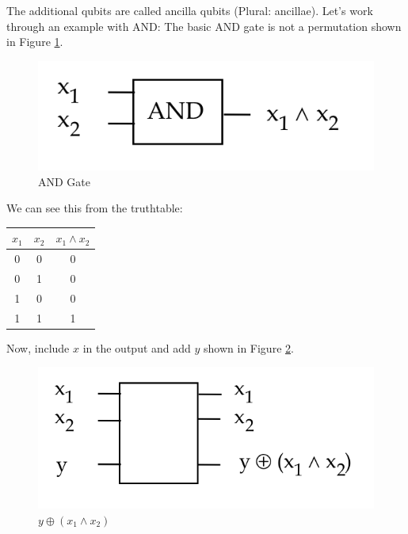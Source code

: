 \documentclass[main.tex]{subfiles}
\begin{document}
    The additional qubits are called ancilla qubits (Plural: ancillae). Let's work through an example with AND: The basic AND gate is not a permutation shown in Figure \ref{fig:37permutation11}.
    
    \begin{figure}
        \centering
        \includegraphics[width=5in]{notes/figs/n10/37permutation11.png}
        \caption{AND Gate}
        \label{fig:37permutation11}
    \end{figure}
    
    We can see this from the truthtable:
    
    \begin{tabular}{|c|c|c|}
    \hline$x_{1}$ & $x_{2}$ & $x_{1} \wedge x_{2}$ \\
    \hline 0 & 0 & 0 \\
    0 & 1 & 0 \\
    1 & 0 & 0 \\
    1 & 1 & 1 \\
    \hline
    \end{tabular}
    
    Now, include $x$ in the output and add $y$ shown in Figure \ref{fig:38permutation12}.
    
    \begin{figure}
        \centering
        \includegraphics[width=5in]{notes/figs/n10/38permutation12.png}
        \caption{$y \oplus\left(x_{1} \wedge x_{2}\right)$}
        \label{fig:38permutation12}
    \end{figure}
    
\end{document}
